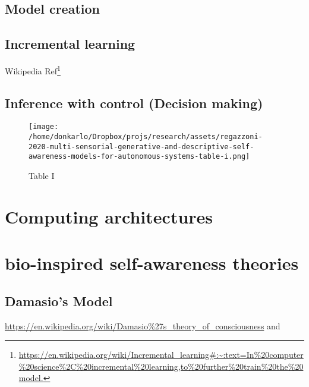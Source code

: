 \documentclass{article}
\begin{document}
			\subsection{Model creation}
				\subsection{Incremental learning}
				Wikipedia Ref\footnote{\url{https://en.wikipedia.org/wiki/Incremental_learning#:~:text=In\%20computer\%20science\%2C\%20incremental\%20learning,to\%20further\%20train\%20the\%20model.}}
				\subsection{}
			\subsection{Inference with control (Decision making)}
		
		\begin{figure*}
			\centering
			\texttt{[image: /home/donkarlo/Dropbox/projs/research/assets/regazzoni-2020-multi-sensorial-generative-and-descriptive-self-awareness-models-for-autonomous-systems-table-i.png]}
			\caption{Table I}
			\label{fig:regazzoni-2020-multi-sensorial-generative-and-descriptive-self-awareness-models-for-autonomous-systems-table-i.jpg}
		\end{figure*}
	\section{Computing architectures}
		\cite{sanz-2009-systems-models-and-self-awareness-towards-architectural-models-of-consciousness}
	\section{bio-inspired self-awareness theories}
		\subsection{Damasio’s Model} \url{https://en.wikipedia.org/wiki/Damasio\%27s_theory_of_consciousness} and \citet{damasio-1999-the-feeling-of-what-happens-body-and-emotion-in-the-making-of-consciousness}
\end{document}
